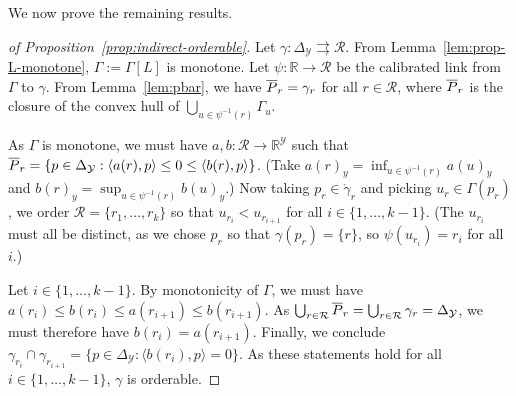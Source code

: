 \documentclass[anon,12pt]{colt2019}
\newcommand{\reals}{\mathbb{R}}
\newcommand{\prop}[1]{\Gamma[#1]}
\newcommand{\simplex}{\Delta_\Y}
\newcommand{\R}{\mathcal{R}}
\newcommand{\Y}{\mathcal{Y}}
\newcommand{\inprod}[2]{\langle #1, #2 \rangle}%
\newcommand{\inter}[1]{\mathring{#1}}%
\newcommand{\toto}{\rightrightarrows}
\begin{document}
We now prove the remaining results.
\begin{proof}[of Proposition~\ref{prop:indirect-orderable}]
  Let $\gamma:\simplex\toto\R$.
  From Lemma~\ref{lem:prop-L-monotone}, $\Gamma := \prop{L}$ is monotone.
  Let $\psi:\reals\to\R$ be the calibrated link from $\Gamma$ to $\gamma$.
  From Lemma~\ref{lem:pbar}, we have $\overline P_r = \gamma_r$ for all $r\in\R$, where $\overline P_r$ is the closure of the convex hull of $\bigcup_{u\in\psi^{-1}(r)} \Gamma_u$.

  As $\Gamma$ is monotone, we must have $a,b : \R\to\reals^\Y$ such that $\Pbar_r = \{p\in\simplex : \inprod{a(r)}{p} \leq 0 \leq \inprod{b(r)}{p} \}$.
  (Take $a(r)_y = \inf_{u\in\psi^{-1}(r)} a(u)_y$ and $b(r)_y = \sup_{u\in\psi^{-1}(r)} b(u)_y$.)
  Now taking $p_r\in\inter\gamma_r$ and picking $u_r \in \Gamma(p_r)$, we order $\R = \{r_1,\ldots,r_k\}$ so that $u_{r_i} < u_{r_{i+1}}$ for all $i\in\{1,\ldots,k-1\}$.
  (The $u_{r_i}$ must all be distinct, as we chose $p_r$ so that $\gamma(p_r) = \{r\}$, so $\psi(u_{r_i}) = r_i$ for all $i$.)

  Let $i\in\{1,\ldots,k-1\}$.
  By monotonicity of $\Gamma$, we must have $a(r_i) \leq b(r_i) \leq a(r_{i+1}) \leq b(r_{i+1})$.
  As $\bigcup_{r\in\R} \Pbar_r = \bigcup_{r\in\R} \gamma_r = \simplex$, we must therefore have $b(r_i) = a(r_{i+1})$.
  Finally, we conclude $\gamma_{r_i} \cap \gamma_{r_{i+1}} = \{p\in\simplex : \inprod{b(r_i)}{p} = 0\}$.
  As these statements hold for all $i\in\{1,\ldots,k-1\}$, $\gamma$ is orderable.
\end{proof}
\end{document}
